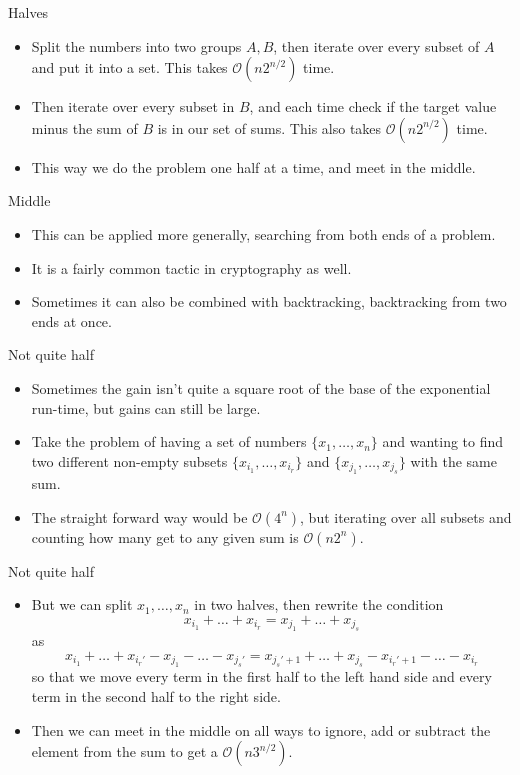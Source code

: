 \documentclass{beamer}
\begin{document}
\begin{frame}{Halves}
    \begin{itemize}
        \item Split the numbers into two groups $A, B$, then iterate over every subset of $A$ and put it into a set. This takes $\mathcal{O}(n2^{n/2})$ time.
        \item Then iterate over every subset in $B$, and each time check if the target value minus the sum of $B$ is in our set of sums. This also takes $\mathcal{O}(n2^{n/2})$ time.
        \item This way we do the problem one half at a time, and meet in the middle.
    \end{itemize}
\end{frame}

\begin{frame}{Middle}
    \begin{itemize}
        \item This can be applied more generally, searching from both ends of a problem.
        \item It is a fairly common tactic in cryptography as well.
        \item Sometimes it can also be combined with backtracking, backtracking from two ends at once.
    \end{itemize}
\end{frame}

\begin{frame}{Not quite half}
    \begin{itemize}
        \item Sometimes the gain isn't quite a square root of the base of the exponential run-time, but gains can still be large.
        \item Take the problem of having a set of numbers $\{x_1, \dots, x_n\}$ and wanting to find two different non-empty subsets $\{x_{i_1}, \dots, x_{i_r}\}$ and $\{x_{j_1}, \dots, x_{j_s}\}$ with the same sum.
        \item The straight forward way would be $\mathcal{O}(4^n)$, but iterating over all subsets and counting how many get to any given sum is $\mathcal{O}(n2^n)$.
    \end{itemize}
\end{frame}

\begin{frame}{Not quite half}
    \begin{itemize}
        \item But we can split $x_1, \dots, x_n$ in two halves, then rewrite the condition
        \[ x_{i_1} + \dots+ x_{i_r} = x_{j_1} + \dots + x_{j_s}\]
        as
        \[ x_{i_1} + \dots + x_{i_r'} - x_{j_1} - \dots - x_{j_s'} = x_{j_s'+1} + \dots + x_{j_s} - x_{i_r' + 1} - \dots - x_{i_r}\]
        so that we move every term in the first half to the left hand side and every term in the second half to the right side.
        \item Then we can meet in the middle on all ways to ignore, add or subtract the element from the sum to get a $\mathcal{O}(n3^{n/2})$.
    \end{itemize}
\end{frame}
\end{document}
